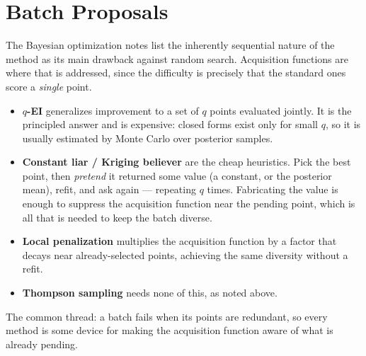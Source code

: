 \documentclass[conference]{IEEEtran}
\begin{document}
\section*{Batch Proposals}
The Bayesian optimization notes list the inherently sequential nature of the method as its main drawback against random search. Acquisition functions are where that is addressed, since the difficulty is precisely that the standard ones score a \textit{single} point.

\begin{itemize}
    \item \textbf{$q$-EI} generalizes improvement to a set of $q$ points evaluated jointly. It is the principled answer and is expensive: closed forms exist only for small $q$, so it is usually estimated by Monte Carlo over posterior samples.
    \item \textbf{Constant liar / Kriging believer} are the cheap heuristics. Pick the best point, then \textit{pretend} it returned some value (a constant, or the posterior mean), refit, and ask again --- repeating $q$ times. Fabricating the value is enough to suppress the acquisition function near the pending point, which is all that is needed to keep the batch diverse.
    \item \textbf{Local penalization} multiplies the acquisition function by a factor that decays near already-selected points, achieving the same diversity without a refit.
    \item \textbf{Thompson sampling} needs none of this, as noted above.
\end{itemize}
The common thread: a batch fails when its points are redundant, so every method is some device for making the acquisition function aware of what is already pending.
\end{document}
